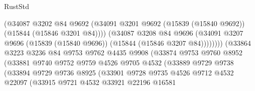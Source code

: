 \begin{lexlean}{RustStd}
\begin{coremodule}
                                      (@34087
                                        @3202
                                        @84
                                        @9692
                                        (@34091
                                          @3201
                                          @9692
                                          (@15839 (@15840 @9692))
                                          (@15844 (@15846 @3201 @84))))
                                      (@34087
                                        @3208
                                        @84
                                        @9696
                                        (@34091
                                          @3207
                                          @9696
                                          (@15839 (@15840 @9696))
                                          (@15844 (@15846 @3207 @84))))))))
                              (@33864
                                @3223
                                @3236
                                @84
                                @9753
                                @9762
                                @4435
                                @9908
                                (@33874
                                  @9753
                                  @9760
                                  @8952
                                  (@33881
                                    @9740
                                    @9752
                                    @9759
                                    @4526
                                    @9705
                                    @4532
                                    (@33889
                                      @9729
                                      @9738
                                      (@33894
                                        @9729
                                        @9736
                                        @8925
                                        (@33901
                                          @9728
                                          @9735
                                          @4526
                                          @9712
                                          @4532
                                          @22097
                                          (@33915
                                            @9721
                                            @4532
                                            @33921
                                            @22196
                                            @16581

\end{coremodule}
\end{lexlean}
